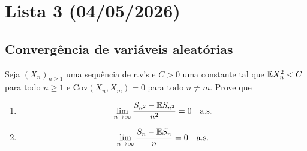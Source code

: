 \section{Lista 3 (04/05/2026)}

\subsection{Convergência de variáveis aleatórias}
\begin{exercise}
	Seja $(X_n)_{n\geq1}$ uma sequência de r.v's e $C > 0$ uma constante tal que
	$\mathbb{E} X_n^2 < C$ para todo $n\geq1$ e $\text{Cov}(X_n, X_m) = 0$ para
	todo $n \neq m$. Prove que
	\begin{enumerate}[label=(\alph*)]
		\item
			\[\lim_{n\rightarrow\infty} \frac{S_{n^2} - \mathbb{E} S_{n^2}}{n^2} = 0 \quad \text{a.s}.\]
		\item
			\[\lim_{n\rightarrow\infty} \frac{S_{n} - \mathbb{E} S_{n}}{n} = 0 \quad \text{a.s}.\]
	\end{enumerate}
\end{exercise}

